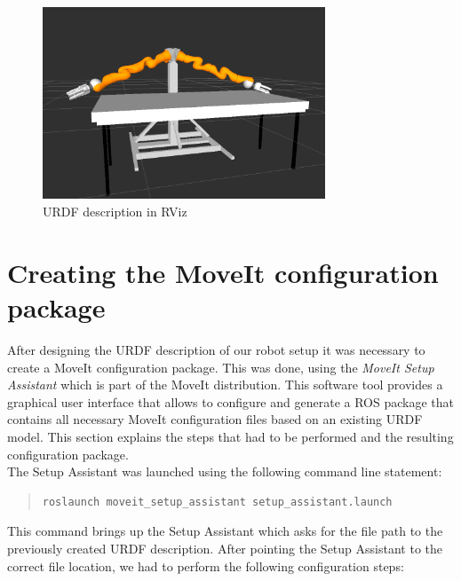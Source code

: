 \begin{figure}
	\centering
  	\includegraphics[width=0.75\textwidth]{images/iis_robot_table.png}
	\caption{URDF description in RViz}
	\label{fig:robot_table}
\end{figure}

\section{Creating the MoveIt configuration package}
\label{sec:moveit_assistant}

After designing the URDF description of our robot setup it was necessary to create a MoveIt configuration package. This was done, using the \emph{MoveIt Setup Assistant} which is part of the MoveIt distribution. This software tool provides a graphical user interface that allows to configure and generate a ROS package that contains all necessary MoveIt configuration files based on an existing URDF model. This section explains the steps that had to be performed and the resulting configuration package. \\ 

The Setup Assistant was launched using the following command line statement:
\begin{quote}
\begin{verbatim}
roslaunch moveit_setup_assistant setup_assistant.launch
\end{verbatim}
\end{quote}
This command brings up the Setup Assistant which asks for the file path to the previously created URDF description. After pointing the Setup Assistant to the correct file location, we had to perform the following configuration steps:

